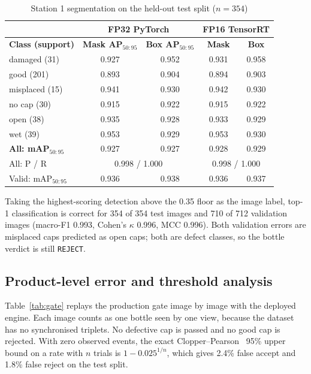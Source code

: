 \begin{table}[htbp]
\centering
\caption{Station 1 segmentation on the held-out test split ($n=354$)}
\label{tab:seg}
\begin{tabular}{|l|c|c|c|c|}
\hline
 & \multicolumn{2}{c|}{\textbf{FP32 PyTorch}} & \multicolumn{2}{c|}{\textbf{FP16 TensorRT}} \\ \hline
\textbf{Class (support)} & \textbf{Mask AP$_{50:95}$} & \textbf{Box AP$_{50:95}$} & \textbf{Mask} & \textbf{Box} \\ \hline
damaged (31) & 0.927 & 0.952 & 0.931 & 0.958 \\ \hline
good (201) & 0.893 & 0.904 & 0.894 & 0.903 \\ \hline
misplaced (15) & 0.941 & 0.930 & 0.942 & 0.930 \\ \hline
no cap (30) & 0.915 & 0.922 & 0.915 & 0.922 \\ \hline
open (38) & 0.935 & 0.928 & 0.933 & 0.929 \\ \hline
wet (39) & 0.953 & 0.929 & 0.953 & 0.930 \\ \hline
\textbf{All: mAP$_{50:95}$} & 0.927 & 0.927 & 0.928 & 0.929 \\ \hline
All: P / R & \multicolumn{2}{c|}{0.998 / 1.000} & \multicolumn{2}{c|}{0.998 / 1.000} \\ \hline
Valid: mAP$_{50:95}$ & 0.936 & 0.938 & 0.936 & 0.937 \\ \hline
\end{tabular}
\end{table}

Taking the highest-scoring detection above the 0.35 floor as the image label, top-1 classification is correct for 354 of 354 test images and 710 of 712 validation images (macro-F1 0.993, Cohen's $\kappa$ 0.996, MCC 0.996). Both validation errors are misplaced caps predicted as open caps; both are defect classes, so the bottle verdict is still \texttt{REJECT}.

\subsection{Product-level error and threshold analysis}
\label{sec:res-gate}
Table~\ref{tab:gate} replays the production gate image by image with the deployed engine. Each image counts as one bottle seen by one view, because the dataset has no synchronised triplets. No defective cap is passed and no good cap is rejected. With zero observed events, the exact Clopper--Pearson~\cite{clopper1934} 95\% upper bound on a rate with $n$ trials is $1-0.025^{1/n}$, which gives 2.4\% false accept and 1.8\% false reject on the test split.

